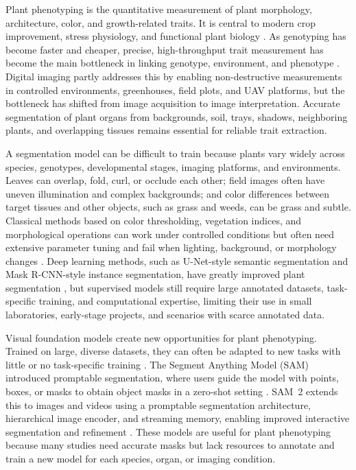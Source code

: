 \documentclass[12pt, a4paper]{article}
\begin{document}
Plant phenotyping is the quantitative measurement of plant morphology, architecture, color, and growth-related traits. It is central to modern crop improvement, stress physiology, and functional plant biology \citep{walter2015plant,furbank2011phenomics}. As genotyping has become faster and cheaper, precise, high-throughput trait measurement has become the main bottleneck in linking genotype, environment, and phenotype
\citep{pound2017deep,singh2016machine}. Digital imaging partly addresses this by enabling non-destructive measurements in controlled environments, greenhouses, field plots, and UAV platforms, but the bottleneck has shifted from image acquisition to image interpretation. Accurate segmentation of plant organs from backgrounds, soil, trays, shadows, neighboring plants, and overlapping tissues remains essential for reliable trait extraction.

A segmentation model can be difficult to train because plants vary widely across species, genotypes, developmental stages, imaging platforms, and environments. Leaves can overlap, fold, curl, or occlude each other; field images often have uneven illumination and complex backgrounds; and color differences between target tissues and other objects, such as grass and weeds, can be grass and subtle. Classical methods based on color thresholding, vegetation indices, and morphological operations can work under controlled conditions but often need extensive parameter tuning and fail when lighting, background, or morphology changes \citep{woebbecke1995color,gitelson2002novel}. Deep learning methods, such as U-Net-style semantic segmentation and Mask R-CNN-style instance segmentation, have greatly improved plant segmentation \citep{ronneberger2015unet,he2017mask,pound2017deep}, but supervised models still require large annotated datasets, task-specific training, and
computational expertise, limiting their use in small laboratories, early-stage projects, and scenarios with scarce annotated data.

Visual foundation models create new opportunities for plant phenotyping. Trained on large, diverse datasets, they can often be adapted to new tasks with little or no task-specific training \citep{bommasani2021opportunities}. The Segment Anything Model (SAM) introduced promptable segmentation, where users guide the model with points, boxes, or masks to obtain object masks in a zero-shot setting \citep{kirillov2023segment}. SAM~2 extends this to images and videos using a promptable segmentation architecture, hierarchical image encoder, and streaming memory, enabling improved interactive segmentation and refinement \citep{ravi2025sam2}. These models are useful for plant phenotyping because many studies need accurate masks but lack resources to annotate and train a new model for each species, organ, or imaging condition.
\end{document}
